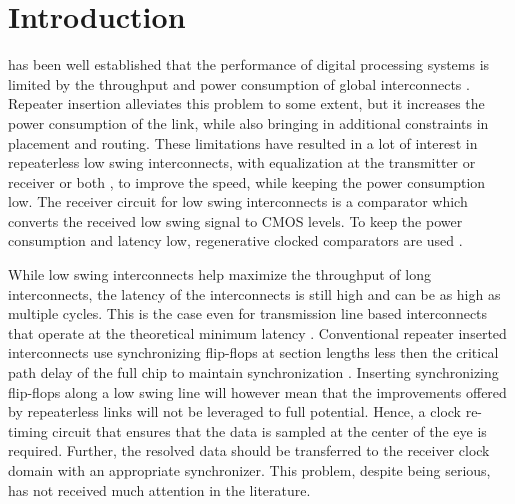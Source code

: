 \documentclass[journal,twoside,letterpaper]{IEEEtran}
\begin{document}
\section{Introduction}
\label{sec:intro}
 has been well established that the performance of
digital processing systems is limited by the throughput and power
consumption of global interconnects
\cite{Katoch-esscirc-2005,Rho-isscc-2007,Mensink-isscc-2007,Kim-isscc-2009}.
Repeater insertion alleviates this
problem to some extent, but it increases the power consumption of the link,
while also bringing in additional constraints in placement and routing.
These limitations
have resulted in a lot of interest in repeaterless low swing interconnects, with
equalization at the transmitter \cite{kim-jssc2010, Rho-isscc-2010, naveen_vlsi13}  
or receiver \cite{Tx_rx_codesign} or both \cite{Lee-jssc14}, to improve the speed,
while keeping the power consumption low. The receiver circuit for low swing
interconnects is a comparator which converts the received low swing signal
to CMOS levels. To keep the power consumption and latency low, regenerative
clocked comparators are used \cite{Mensink-jssc-2010,naveen_vlsi13,Lee-issc13}.

While low swing interconnects help maximize the throughput of long
interconnects, the latency of the interconnects is still high and can
be as high as multiple cycles. This is the case even for transmission line based
interconnects that operate at the theoretical minimum latency \cite{richard-jssc}.
Conventional repeater inserted interconnects use
synchronizing flip-flops at section lengths less then the critical path
delay of the full chip to maintain synchronization \cite{Lu-DATE-2002}. 
Inserting synchronizing flip-flops along a low swing line
will however mean that the improvements offered by repeaterless links
will not be leveraged to full potential.
Hence, a clock re-timing circuit that ensures that the data is sampled at the 
center of the eye is required. Further, the resolved data should be 
transferred to 
the receiver clock domain with an appropriate synchronizer.
This problem, despite being serious, has not received much attention in the literature.
\end{document}
